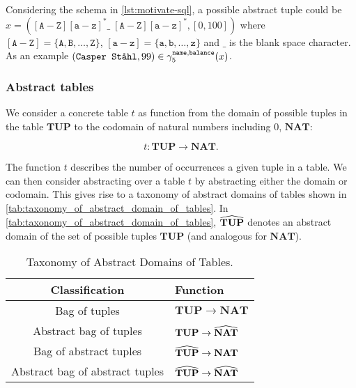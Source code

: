Considering the schema in \autoref{lst:motivate-sql}, a possible abstract tuple could be $x = ([\texttt{A}-\texttt{Z}][\texttt{a}-\texttt{z}]^* \_ \; [\texttt{A}-\texttt{Z}][\texttt{a}-\texttt{z}]^*, [0, 100])$ where $[\texttt{A}-\texttt{Z}] = \{\texttt{A}, \texttt{B}, \dots, \texttt{Z}\}$, $[\texttt{a}-\texttt{z}] = \{\texttt{a}, \texttt{b}, \dots, \texttt{z}\}$ and $\_$ is the blank space character.
As an example $(\texttt{Casper Ståhl}, 99) \in \gamma_5^{\texttt{name},\texttt{balance}}(x)$.

\subsubsection{Abstract tables}\label{subsubsec:abstract_domain_of_tables}
We consider a concrete table $t$ as function from the domain of possible tuples in the table $\mathbf{TUP}$ to the codomain of natural numbers including $0$, $\mathbf{NAT}$:


\begin{equation}
    t : \mathbf{TUP} \rightarrow \mathbf{NAT}.\label{eq:equation-tup-nat}
\end{equation}


The function $t$ describes the number of occurrences a given tuple in a table.
We can then consider abstracting over a table $t$ by abstracting either the domain or codomain.
This gives rise to a taxonomy of abstract domains of tables shown in \autoref{tab:taxonomy_of_abstract_domain_of_tables}.
In \autoref{tab:taxonomy_of_abstract_domain_of_tables}, $\widehat{\mathbf{TUP}}$ denotes an abstract domain of the set of possible tuples $\mathbf{TUP}$ (and analogous for $\mathbf{NAT}$).


\begin{table}
    \renewcommand{\arraystretch}{1.3}
    \caption{Taxonomy of Abstract Domains of Tables.}
    \centering
    \begin{tabular}{c|l}
        \toprule
        Classification                  & Function                                \\ \midrule
        Bag of tuples                   & $\mathbf{TUP} \rightarrow \mathbf{NAT}$           \\
        Abstract bag of tuples          & $\mathbf{TUP} \rightarrow \widehat{\mathbf{NAT}}$      \\
        Bag of abstract tuples          & $\widehat{\mathbf{TUP}} \rightarrow \mathbf{NAT}$      \\
        Abstract bag of abstract tuples & $\widehat{\mathbf{TUP}} \rightarrow \widehat{\mathbf{NAT}}$ \\ \bottomrule
    \end{tabular}
    \label{tab:taxonomy_of_abstract_domain_of_tables}
\end{table}

